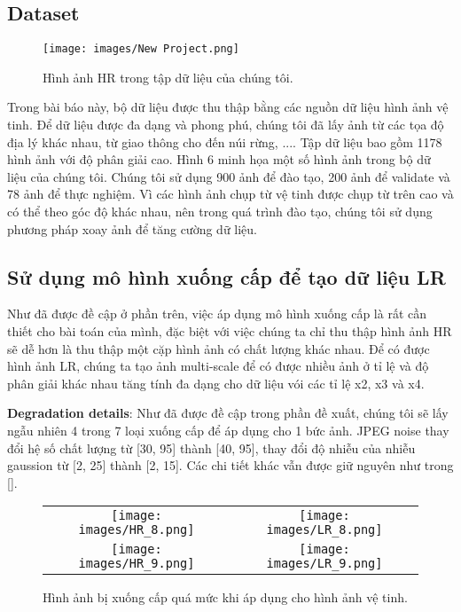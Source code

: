 \documentclass[conference]{IEEEtran}
\begin{document}
\subsection{Dataset} \label{sect:dataset}
\begin{figure} [!t]
    \centering
    \texttt{[image: images/New Project.png]}
    \caption{Hình ảnh HR trong tập dữ liệu của chúng tôi.}
    \label{fig:6}
\end{figure}
Trong bài báo này, bộ dữ liệu được thu thập bằng các nguồn dữ liệu hình ảnh vệ tinh. Để dữ liệu được đa dạng và phong phú, chúng tôi đã lấy ảnh từ các tọa độ địa lý khác nhau, từ giao thông cho đến núi rừng, .... Tập dữ liệu bao gồm 1178 hình ảnh với độ phân giải cao. Hình 6 minh họa một số hình ảnh trong bộ dữ liệu của chúng tôi. Chúng tôi sử dụng 900 ảnh để đào tạo, 200 ảnh để validate và 78 ảnh để thực nghiệm. Vì các hình ảnh chụp từ vệ tinh được chụp từ trên cao và có thể theo góc độ khác nhau, nên trong quá trình đào tạo, chúng tôi sử dụng phương pháp xoay ảnh để tăng cường dữ liệu.

\subsection{Sử dụng mô hình xuống cấp để tạo dữ liệu LR} \label{sect:expRes}
Như đã được đề cập ở phần trên, việc áp dụng mô hình xuống cấp là rất cần thiết cho bài toán của mình, đặc biệt với việc chúng ta chỉ thu thập hình ảnh HR sẽ dễ hơn là thu thập một cặp hình ảnh có chất lượng khác nhau. Để có được hình ảnh LR, chúng ta tạo ảnh multi-scale để có được nhiều ảnh ở tỉ lệ và độ phân giải khác nhau tăng tính đa dạng cho dữ liệu vói các tỉ lệ x2, x3 và x4. 

\textbf{Degradation details}: Như đã được đề cập trong phần đề xuất, chúng tôi sẽ lấy ngẫu nhiên 4 trong 7 loại xuống cấp để áp dụng cho 1 bức ảnh. JPEG noise thay đổi hệ số chất lượng từ [30, 95] thành [40, 95], thay đổi độ nhiễu của nhiễu gaussion từ [2, 25] thành [2, 15]. Các chi tiết khác vẫn được giữ nguyên như trong [].


\begin{figure}[h] \label{fig:8}
    \begin{tabular}{cc}
        \texttt{[image: images/HR\_8.png]} &
        \texttt{[image: images/LR\_8.png]} \\
        \texttt{[image: images/HR\_9.png]} &
        \texttt{[image: images/LR\_9.png]} \\
    \end{tabular}
    \caption{Hình ảnh bị xuống cấp quá mức khi áp dụng cho hình ảnh vệ tinh.}
\end{figure}
\end{document}
